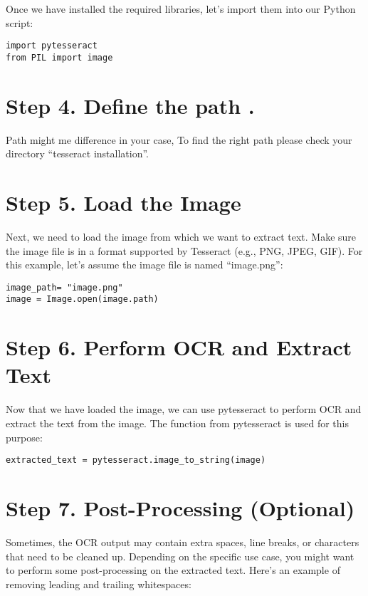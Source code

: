    Once we have installed the required libraries, let’s import them into our Python script:

\begin{lstlisting}
import pytesseract
from PIL import image
\end{lstlisting}    
    
\section{Step 4. Define the path .}

Path  might me difference in your case, To find the right path please check your directory ``tesseract installation''.



\section{Step 5. Load the Image}

Next, we need to load the image from which we want to extract text. Make sure the image file is in a format supported by Tesseract (e.g., PNG, JPEG, GIF). For this example, let’s assume the image file is named ``image.png'':

\begin{lstlisting}
image_path= "image.png"
image = Image.open(image.path)  
\end{lstlisting}    

\section{Step 6. Perform OCR and Extract Text}

Now that we have loaded the image, we can use pytesseract to perform OCR and extract the text from the image. The function  from pytesseract is used for this purpose:

\begin{lstlisting}
extracted_text = pytesseract.image_to_string(image)
\end{lstlisting}    

\section{Step 7. Post-Processing (Optional)}

Sometimes, the OCR output may contain extra spaces, line breaks, or characters that need to be cleaned up. Depending on the specific use case, you might want to perform some post-processing on the extracted text. Here’s an example of removing leading and trailing whitespaces:

